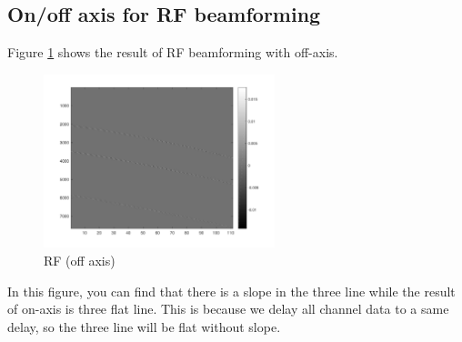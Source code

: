 \documentclass{article}
\begin{document}
\subsection{On/off axis for RF beamforming}
Figure \ref{fig:RF-off} shows the result of RF beamforming with off-axis.
\begin{figure}[H]
    \centering
    \includegraphics[width=0.6\textwidth]{src/RF/off-axis.pdf}
    \caption{RF (off axis)}
    \label{fig:RF-off}
\end{figure}
In this figure, you can find that there is a slope in the three line while the result of on-axis is three flat line. This is because
we delay all channel data to a same delay, so the three line will be flat without slope.
\end{document}
